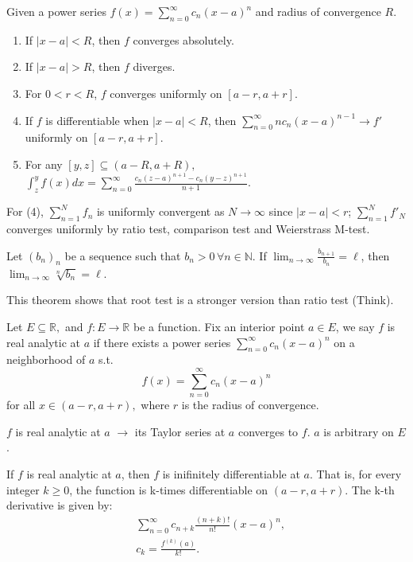\documentclass[12pt]{article}
\begin{document}
\begin{theorem}
Given a power series $f(x)= \sum_{n=0}^{\infty}c_n(x-a)^n$ and radius of convergence $R$.
\begin{enumerate}
    \item If $|x-a|<R$, then $f$ converges absolutely.
    \item If $|x-a|>R$, then $f$ diverges.
    \item For $0<r<R$, $f$ converges uniformly on $[a-r, a+r].$
    \item If $f$ is differentiable when $|x-a|<R$, then $\sum_{n=0}^{\infty}n c_n(x-a)^{n-1}\rightarrow f'$ uniformly on $[a-r, a+r].$
    \item For any $[y,z]\subseteq(a-R,a+R),$ $\int_{z}^{y}f(x)dx=\sum_{n=0}^{\infty}\frac{c_n(z-a)^{n+1}-c_n(y-z)^{n+1}}{n+1}.$
\end{enumerate}
\end{theorem}

\begin{pfbox}
    For (4),  $\sum_{n=1}^{N}f_n$ is uniformly convergent as $N\rightarrow\infty$ since $|x-a|<r$; $\sum_{n=1}^{N}f'_N$ converges uniformly by ratio test, comparison test and Weierstrass M-test.
\end{pfbox}

\begin{theorem}
Let $(b_n)_n$ be a sequence such that $b_n>0\,\forall n\in\mathbb{N}$.
If $\lim_{n\rightarrow\infty}\frac{b_{n+1}}{b_n}=\ell$, then $\lim_{n\rightarrow\infty}\sqrt[n]{b_n} = \ell.$
\end{theorem}

This theorem shows that root test is a stronger version than ratio test (Think).

\begin{definition}
    Let $E\subseteq\mathbb{R},$ and $f:E\rightarrow\mathbb{R}$ be a function.
    Fix an interior point $a\in E$, we say $f$ is real analytic at $a$ if there exists a power series $\sum_{n=0}^{\infty}c_n(x-a)^n$ on a neighborhood of $a$ s.t.
    \[f(x)=\sum_{n=0}^{\infty}c_n(x-a)^n\]
    for all $x\in (a-r, a+r),$ where $r$ is the radius of convergence.
\end{definition}

\begin{remark}
    $f$ is real analytic at $a$ $\rightarrow$ its Taylor series at $a$ converges to $f$. $a$ is arbitrary on $E$.
\end{remark}

\begin{theorem}
    If $f$ is real analytic at $a$, then $f$ is inifinitely differentiable at $a$.
    That is, for every integer $k\geq 0$, the function is k-times differentiable on $(a-r, a+r).$
    The k-th derivative is given by:
    \begin{equation*}
    \begin{split}
        &\sum_{n=0}^{\infty}c_{n+k}\frac{(n+k)!}{n!}(x-a)^{n},\\
        &c_k = \frac{f^{(k)}(a)}{k!}.
    \end{split}
    \end{equation*}
\end{theorem}
\end{document}
